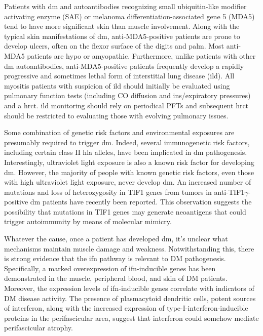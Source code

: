 Patients with \gls{dm} and autoantibodies recognizing small ubiquitin-like modifier activating enzyme (SAE) or melanoma differentiation-associated gene 5 (MDA5) tend to have more significant skin than muscle involvement.\cite{Ge2017,LabradorHorrillo2014,Sato2009,Narang2015} Along with the typical skin manifestations of \gls{dm}, anti-MDA5-positive patients are prone to develop ulcers, often on the flexor surface of the digits and palm.\cite{Narang2015} Most anti-MDA5 patients are hypo or amyopathic.\cite{LabradorHorrillo2014,Sato2009,Narang2015} Furthermore, unlike patients with other \gls{dm} autoantibodies, anti-MDA5-positive patients frequently develop a rapidly progressive and sometimes lethal form of interstitial lung disease (\gls{ild}).\cite{LabradorHorrillo2014,Sato2009} All myositis patients with suspicion of \gls{ild} should initially be evaluated using pulmonary function tests (including CO diffusion and ins/expiratory pressures) and a \gls{hrct}. \gls{ild} monitoring should rely on periodical PFTs and subsequent \gls{hrct} should be restricted to evaluating those with evolving pulmonary issues.

Some combination of genetic risk factors and environmental exposures are presumably required to trigger \gls{dm}. Indeed, several immunogenetic risk factors, including certain class II \gls{hla} alleles, have been implicated in \gls{dm} pathogenesis.\cite{Miller2015} Interestingly, ultraviolet light exposure is also a known risk factor for developing \gls{dm}.\cite{Mamyrova2017} However, the majority of people with known genetic risk factors, even those with high ultraviolet light exposure, never develop \gls{dm}. An increased number of mutations and loss of heterozygosity in TIF1 genes from tumors in anti-TIF1$\gamma$-positive \gls{dm} patients have recently been reported.\cite{PinalFernandez2018} This observation suggests the possibility that mutations in TIF1 genes may generate neoantigens that could trigger autoimmunity by means of molecular mimicry.

Whatever the cause, once a patient has developed \gls{dm}, it’s unclear what mechanisms maintain muscle damage and weakness. Notwithstanding this, there is strong evidence that the \gls{ifn} pathway is relevant to DM pathogenesis.\cite{Greenberg2005} Specifically, a marked overexpression of \gls{ifn}-inducible genes has been demonstrated in the muscle,\cite{Greenberg2005} peripheral blood,\cite{Walsh2007,Baechler2007} and skin\cite{Wong2012} of DM patients. Moreover, the expression levels of \gls{ifn}-inducible genes correlate with indicators of DM disease activity.\cite{Walsh2007,Baechler2007} The presence of plasmacytoid dendritic cells, potent sources of interferon, along with the increased expression of type-I-interferon-inducible proteins in the perifascicular area, suggest that interferon could somehow mediate perifascicular atrophy.\cite{SuarezCalvet2017,Greenberg2005} 

